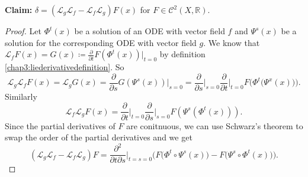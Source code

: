 \documentclass[hidelinks,a4paper, 11pt]{article}
\theoremstyle{plain}
\theoremstyle{break}
\theoremstyle{plain}
\theoremstyle{definition}
\begin{document}
\textbf{Claim:} $\delta = (\mathcal L_g \mathcal L_f - \mathcal L_f \mathcal L_g)F(x)$ for $F \in \mathcal C^2(X, \mathbb R)$.
\begin{proof}
	Let $\Phi^t(x)$ be a solution of an ODE with vector field $f$ and $\Psi^s(x)$ be a solution for the corresponding ODE with vector field $g$. We know that $\mathcal L_fF(x) = G(x) \coloneqq \frac{\partial}{\partial t}F(\Phi^t(x))\Big \vert_{t=0}$ by definition \ref{chap3:liederivativedefinition}. So
	\[
		\mathcal L_g \mathcal L_f F(x)= \mathcal L_g G(x) = \frac{\partial}{\partial s} G(\Psi^s(x)) \Big \vert_{s=0} = \frac{\partial}{\partial s} \Big \vert_{s=0} \frac{\partial}{\partial t} \Big \vert_{t=0} F\Big(\Phi^t\big(\Psi^x(x) \big)\Big).
	\]
	Similarly
	\[
		\mathcal L_f \mathcal L_g F(x) = \frac{\partial}{\partial t} \Big \vert_{t=0} \frac{\partial}{\partial s}\Big \vert_{s=0} F(\Psi^s(\Phi^t(x))).
	\]
	Since the partial derivatives of $F$ are conitnuous, we can use Schwarz's theorem to swap the order of the partial derivatives and we get
	\[
		(\mathcal L_g \mathcal L_f - \mathcal L_f \mathcal L_g)F = \frac{\partial^2}{\partial t \partial s} \Big \vert_{t=s=0}\Big(F\big(\Phi^t \circ \Psi^s(x) \big) - F\big(\Psi^s \circ \Phi^t(x)\big) \Big).
	\]
\end{proof}
\end{document}

